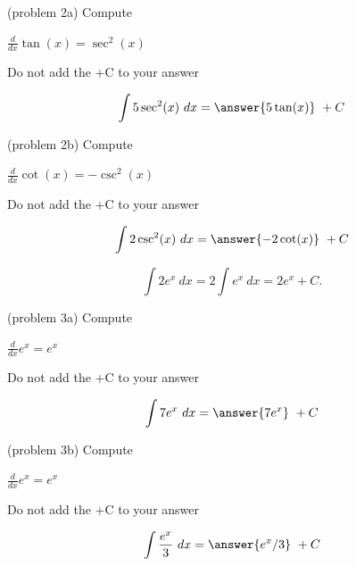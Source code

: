 \documentclass[handout]{ximera}
\begin{document}
\begin{problem}(problem 2a)
Compute

\begin{hint}
$\frac{d}{dx} \tan(x) = \sec^2(x)$
\end{hint}
\begin{hint}
Do not add the +C to your answer
\end{hint}

\[
\int 5\sec^2(x) \ dx =
\answer{5\tan(x)} \ +  C
\]
\end{problem}


\begin{problem}(problem 2b)
Compute

\begin{hint}
$\frac{d}{dx} \cot(x) = -\csc^2(x)$
\end{hint}
\begin{hint}
Do not add the +C to your answer
\end{hint}

\[
\int 2\csc^2(x) \ dx =
\answer{-2\cot(x)} \ +  C
\]
\end{problem}


\begin{example}[example 3]
\[
\int 2e^x \ dx = 2 \int e^x \ dx = 2e^x +C.
\]
\end{example}


\begin{problem}(problem 3a)
Compute

\begin{hint}
$\frac{d}{dx} e^x = e^x$
\end{hint}
\begin{hint}
Do not add the +C to your answer
\end{hint}

\[
\int 7e^x \ dx =
\answer{7e^x} \ +  C
\]
\end{problem}


\begin{problem}(problem 3b)
Compute

\begin{hint}
$\frac{d}{dx} e^x = e^x$
\end{hint}
\begin{hint}
Do not add the +C to your answer
\end{hint}

\[
\int \frac{e^x}{3} \ dx =
\answer{e^x /3} \ +  C
\]
\end{problem}
\end{document}
